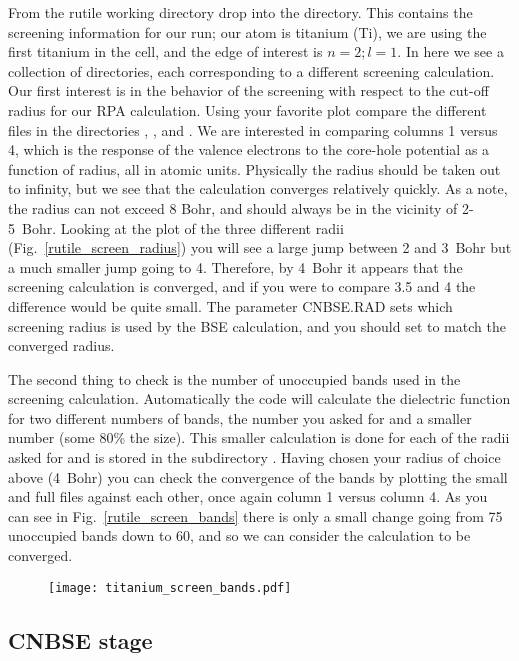 \documentclass[11pt]{report}
\begin{document}
From the rutile working directory drop into the  directory. This contains the screening information for our run; our atom is titanium (Ti), we are using the first titanium in the cell, and the edge of interest is $n=2;l=1$. In here we see a collection of directories, each corresponding to a different screening calculation. Our first interest is in the behavior of the screening with respect to the cut-off radius for our RPA calculation. Using your favorite plot compare the different  files in the directories , , and . We are interested in comparing columns 1 versus 4, which is the response of the valence electrons to the core-hole potential as a function of radius, all in atomic units. Physically the radius should be taken out to infinity, but we see that the calculation converges relatively quickly. As a note, the radius can not exceed 8 Bohr, and should always be in the vicinity of 2-5~Bohr. Looking at the plot of the three different radii (Fig.\ \ref{rutile_screen_radius}) you will see a large jump between 2 and 3~Bohr but a much smaller jump going to 4. Therefore, by 4~Bohr it appears that the screening calculation is converged, and if you were to compare 3.5 and 4 the difference would be quite small. The parameter CNBSE.RAD sets which screening radius is used by the BSE calculation, and you should set to match the converged radius.


The second thing to check is the number of unoccupied bands used in the screening calculation. Automatically the code will calculate the dielectric function for two different numbers of bands, the number you asked for and a smaller number (some 80\% the size). This smaller calculation is done for each of the radii asked for and is stored in the subdirectory . Having chosen your radius of choice above (4~Bohr) you can check the convergence of the bands by plotting the small and full  files against each other, once again column 1 versus column 4. As you can see in Fig.\ \ref{rutile_screen_bands} there is only a small change going from 75 unoccupied bands down to 60, and so we can consider the calculation to be converged.

\begin{figure}
\texttt{[image: titanium\_screen\_bands.pdf]}
\label{titanium_screen_bands}
\end{figure}


\subsection{CNBSE stage}
\end{document}

